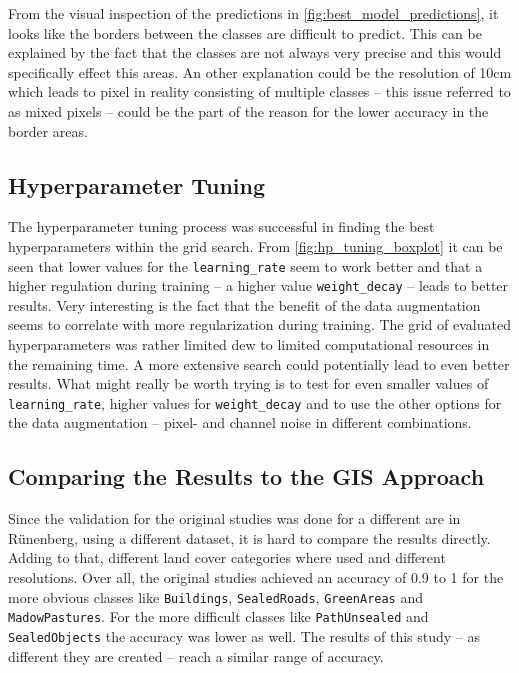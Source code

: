 From the visual inspection of the predictions in \autoref{fig:best_model_predictions},
it looks like the borders between the classes are difficult to predict. This can be
explained by the fact that the classes are not always very precise and this would
specifically effect this areas. An other explanation could be the resolution of 10cm
which leads to pixel in reality consisting of multiple classes -- this issue referred to
as mixed pixels -- could be the part of the reason for the lower accuracy in the
border areas.

\subsection{Hyperparameter Tuning}

The hyperparameter tuning process was successful in finding the best hyperparameters
within the grid search. From \autoref{fig:hp_tuning_boxplot} it can be seen that
lower values for the \texttt{learning\_rate} seem to work better and that
a higher regulation during training -- a higher value \texttt{weight\_decay} -- leads to
better results. Very interesting is the fact that the benefit of the data augmentation
seems to correlate with more regularization during training.
The grid of evaluated hyperparameters was rather limited dew to limited computational
resources in the remaining time. A more extensive search could potentially lead to
even better results. What might really be worth trying is to test for even smaller
values of \texttt{learning\_rate}, higher values for \texttt{weight\_decay} 
and to use the other options for the data augmentation --
pixel- and channel noise in different combinations.

\subsection{Comparing the Results to the GIS Approach}

Since the validation for the original studies was done for a different are in Rünenberg,
using a different dataset, it is hard to compare the results directly. Adding to that,
different land cover categories where used and different resolutions. Over all, the
original studies achieved an accuracy of 0.9 to 1 for the more obvious classes like
\texttt{Buildings}, \texttt{SealedRoads}, \texttt{GreenAreas} and \texttt{MadowPastures}. 
For the more difficult classes like \texttt{PathUnsealed} and \texttt{SealedObjects} the
accuracy was lower as well. The results of this study -- as different they are created --
reach a similar range of accuracy.

